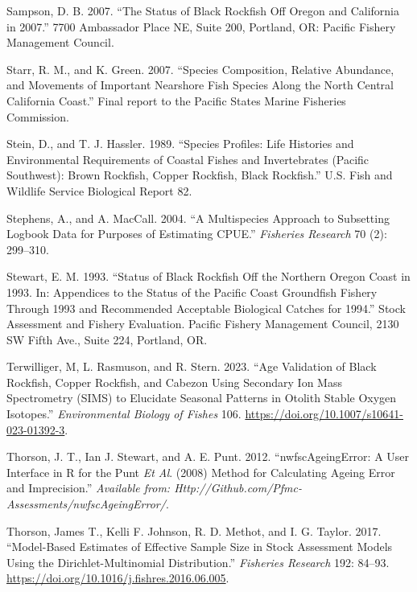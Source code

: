 \documentclass[11pt,
  english,
  letterpaper,
]{article}
\newlength{\cslhangindent}
\newenvironment{CSLReferences}[2] %
 {%
  \setlength{\parindent}{0pt}
  \ifodd #1 \everypar{\setlength{\hangindent}{\cslhangindent}}\ignorespaces\fi
  \ifnum #2 > 0
  \setlength{\parskip}{#2\baselineskip}
  \fi
 }%
 {}
\begin{document}
\begin{CSLReferences}{1}{0}
\leavevmode{}%
Sampson, D. B. 2007. {``The Status of Black Rockfish Off Oregon and California in 2007.''} 7700 Ambassador Place NE, Suite 200, Portland, OR: Pacific Fishery Management Council.

\leavevmode{}%
Starr, R. M., and K. Green. 2007. {``Species Composition, Relative Abundance, and Movements of Important Nearshore Fish Species Along the North Central California Coast.''} Final report to the Pacific States Marine Fisheries Commission.

\leavevmode{}%
Stein, D., and T. J. Hassler. 1989. {``Species Profiles: Life Histories and Environmental Requirements of Coastal Fishes and Invertebrates (Pacific Southwest): Brown Rockfish, Copper Rockfish, Black Rockfish.''} U.S. Fish and Wildlife Service Biological Report 82.

\leavevmode{}%
Stephens, A., and A. MacCall. 2004. {``A Multispecies Approach to Subsetting Logbook Data for Purposes of Estimating {CPUE}.''} \emph{Fisheries Research} 70 (2): 299--310.

\leavevmode{}%
Stewart, E. M. 1993. {``Status of Black Rockfish Off the Northern Oregon Coast in 1993. In: Appendices to the Status of the Pacific Coast Groundfish Fishery Through 1993 and Recommended Acceptable Biological Catches for 1994.''} Stock Assessment and Fishery Evaluation. Pacific Fishery Management Council, 2130 SW Fifth Ave., Suite 224, Portland, OR.

\leavevmode{}%
Terwilliger, M, L. Rasmuson, and R. Stern. 2023. {``Age Validation of Black Rockfish, Copper Rockfish, and Cabezon Using Secondary Ion Mass Spectrometry (SIMS) to Elucidate Seasonal Patterns in Otolith Stable Oxygen Isotopes.''} \emph{Environmental Biology of Fishes} 106. \url{https://doi.org/10.1007/s10641-023-01392-3}.

\leavevmode{}%
Thorson, J. T., Ian J. Stewart, and A. E. Punt. 2012. {``{nwfscAgeingError}: A User Interface in {R} for the {P}unt \emph{Et Al}. (2008) Method for Calculating Ageing Error and Imprecision.''} \emph{Available from: Http://Github.com/Pfmc-Assessments/nwfscAgeingError/}.

\leavevmode{}%
Thorson, James T., Kelli F. Johnson, R. D. Methot, and I. G. Taylor. 2017. {``Model-Based Estimates of Effective Sample Size in Stock Assessment Models Using the {Dirichlet}-Multinomial Distribution.''} \emph{Fisheries Research} 192: 84--93. \url{https://doi.org/10.1016/j.fishres.2016.06.005}.


\end{CSLReferences}
\end{document}
